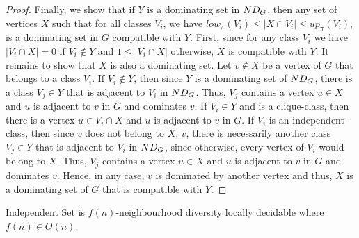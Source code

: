 \begin{proof}
  
  Finally, we show that if $Y$ is a dominating set in $\ndg[G]$, then any set of vertices $X$ such that for all classes $V_i$, we have $low_\pi(V_i) \leq |X \cap V_i| \leq up_\pi(V_i)$,  is a dominating set in $G$ compatible with $Y$. First, since for any class $V_i$ we have $|V_i \cap X| = 0$ if $V_i \not\in Y$ and $1 \leq |V_i \cap X|$ otherwise, $X$ is compatible with $Y$. It remains to show that $X$ is also a dominating set.
  Let $v \not\in X$ be a vertex of $G$ that belongs to a class $V_i$. If $V_i \not\in Y$, then since $Y$ is a dominating set of $\ndg[G]$,  there is a class $V_j \in Y$ that is adjacent to $V_i$ in $\ndg[G]$. Thus, $V_j$ contains a vertex $u \in X$ and $u$ is adjacent to $v$ in $G$ and dominates $v$.
  If $V_i \in Y$ and is a clique-class, then there is a vertex $u \in V_i \cap X$ and $u$ is adjacent to $v$ in $G$. If $V_i$ is an independent-class, then since $v$ does not belong to $X$, $v$, there is necessarily another class $V_j \in Y$ that is adjacent to $V_i$ in $\ndg[G]$, since otherwise, every vertex of $V_i$ would belong to $X$. Thus, $V_j$ contains a vertex $u \in X$ and $u$ is adjacent to $v$ in $G$ and dominates $v$. Hence, in any case, $v$ is dominated by another vertex and thus, $X$ is a dominating set of $G$ that is compatible with $Y$.
\end{proof}

\begin{lemmarep}
  \label{lemma:is is ndld} {\sc Independent Set} is $f(n)$-neighbourhood diversity locally decidable where $f(n) \in O(n)$. 
\end{lemmarep}

